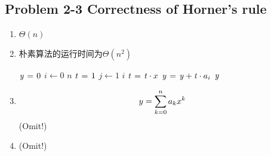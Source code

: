 \subsection*{Problem 2-3 Correctness of Horner’s rule}

\begin{enumerate}
	\item	$\Theta(n)$ 
	\item	朴素算法的运行时间为$\Theta(n^2)$ \\
		\begin{codebox}
		\li	$\id{y} \gets 0$
		\li	\For $i \gets 0$ \To $n$
		\li	\Do
				$\id{t} \gets 1$
		\li		\For $j \gets 1$ \To $i$
		\li		\Do
					$\id{t} \gets \id{t} \cdot x$
				\End
		\li		$\id{y} \gets \id{y} + \id{t} \cdot a_i$
			\End
		\li	\Return $\id{y}$
		\end{codebox}		
		
	\item	\begin{equation} \notag
		y = \sum_{k = 0}^{n}a_kx^k
		\end{equation}
		(Omit!)
	\item	(Omit!)
\end{enumerate}

